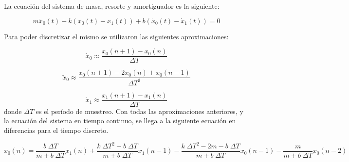 La ecuación del sistema de masa, resorte y amortiguador es la siguiente:

\begin{equation*}
	m \ddot{x}_{0}(t) + k (x_{0}(t) - x_{1}(t)) + b (\dot{x}_{0}(t) - \dot{x}_{1}(t)) = 0
\end{equation*}

Para poder discretizar el mismo se utilizaron las siguientes aproximaciones:

\begin{equation*}
	\dot{x}_{0} \approx \frac{x_{0}(n + 1) - x_{0}(n)}{\Delta T}
\end{equation*}

\begin{equation*}
	\ddot{x}_{0} \approx \frac{x_{0}(n + 1) - 2 x_{0}(n) + x_{0}(n - 1)}{\Delta T^2}
\end{equation*}

\begin{equation*}
	\dot{x}_{1} \approx \frac{x_{1}(n + 1) - x_{1}(n)}{\Delta T}
\end{equation*}
donde $\Delta T$ es el período de muestreo. Con todas las aproximaciones anteriores, y la ecuación del sistema en tiempo continuo, se llega a la siguiente ecuación en diferencias para el tiempo discreto.

\begin{equation*}
	x_{0}(n) = \frac{b \;\Delta T}{m + b \;\Delta T} x_{1}(n) + \frac{k \;\Delta T^2 - b \;\Delta T}{m + b \;\Delta T} x_{1}(n - 1) - \frac{k \;\Delta T^2 - 2 m - b \;\Delta T}{m + b \;\Delta T} x_{0}(n - 1) - \frac{m}{m + b \;\Delta T} x_{0}(n - 2)
\end{equation*}

